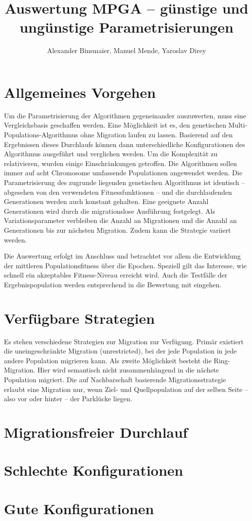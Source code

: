 \documentclass[12pt,a4paper]{article}
\author{Alexander Binsmaier, Manuel Mende, Yaroslav Direy}
\title{Auswertung MPGA -- günstige und ungünstige Parametrisierungen}
\begin{document}
\maketitle
\tableofcontents
\section{Allgemeines Vorgehen}
Um die Parametrisierung der Algorithmen gegeneinander auszuwerten, muss eine Vergleichsbasis geschaffen werden. Eine Möglichkeit ist es, den genetischen Multi-Populations-Algorithmus ohne Migration laufen zu lassen. Basierend auf den Ergebnissen dieses Durchlaufs können dann unterschiedliche Konfigurationen des Algorithmus ausgeführt und verglichen werden. Um die Komplexität zu relativieren, wurden einige Einschränkungen getroffen. Die Algorithmen sollen immer auf acht Chromosome umfassende Populationen angewendet werden. Die Parametrisierung des zugrunde liegenden genetischen Algorithmus ist identisch -- abgesehen von den verwendeten Fitnessfunktionen -- und die durchlaufenden Generationen werden auch konstant gehalten. Eine geeignete Anzahl Generationen wird durch die migrationslose Ausführung festgelegt. Als Variationsparameter verbleiben die Anzahl an Migrationen und die Anzahl an Generationen bis zur nächsten Migration. Zudem kann die Strategie variiert werden.

 Die Auswertung erfolgt im Anschluss und betrachtet vor allem die Entwicklung der mittleren Populationsfitness über die Epochen. Speziell gilt das Interesse, wie schnell ein akzeptables Fitness-Niveau erreicht wird. Auch die Testfälle der Ergebnispopulation werden entsprechend in die Bewertung mit eingehen.

\section{Verfügbare Strategien}
Es stehen verschiedene Strategien zur Migration zur Verfügung. Primär existiert die uneingeschränkte Migration (unrestricted), bei der jede Population in jede andere Population migrieren kann. Als zweite Möglichkeit besteht die Ring-Migration. Hier wird semantisch nicht zusammenhängend in die nächste Population migriert. Die auf Nachbarschaft basierende Migrationsstrategie erlaubt eine Migration nur, wenn Ziel- und Quellpopulation auf der selben Seite -- also vor oder hinter -- der Parklücke liegen. 

\section{Migrationsfreier Durchlauf}
\section{Schlechte Konfigurationen}
\section{Gute Konfigurationen}
\end{document}
